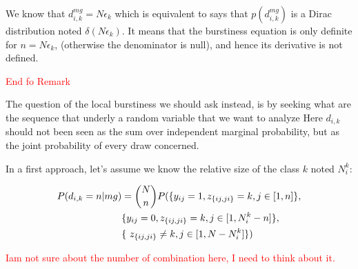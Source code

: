 We know that $d_{i,k}^{mg} = N \epsilon_k$ which is equivalent to says that $p(d_{i,k}^{mg})$ is a Dirac distribution noted $\delta (N\epsilon_k)$. It means that the burstiness equation is only definite for $n = N\epsilon_k$, (otherwise the denominator is null), and hence its derivative is not defined.


\textcolor{red}{End fo Remark
\hrulefill
\hrulefill
~\\
}

The question of the local burstiness we should ask instead, is by seeking what are the sequence that underly a random variable that we want to analyze Here $d_{i,k}$ should not been seen as the sum over independent marginal probability, but as the joint probability of every draw concerned. 

In a first approach, let's assume we know the relative size of the class $k$ noted $N_i^k$:

\begin{align*}
P(d_{i,k}=n | mg) &= \dbinom{N}{n} P(\{y_{ij}=1, z_{\{ij,ji\}}=k, j\in [1,n]\}, \\ & \{y_{ij}=0, z_{\{ij,ji\}}=k, j\in [1,N_i^k-n]\}, \\
&  \{\ z_{\{ij,ji\}}\neq k, j\in [1,N-N_i^k]\}) \\
\end{align*}


\textcolor{red}{Iam not sure about the number of combination here, I need to think about it.}
